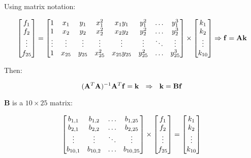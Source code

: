 \documentclass{ipol}
\numberwithin{equation}{section}
\numberwithin{table}{section}
\numberwithin{figure}{section}
\begin{document}
Using matrix notation:

\begin{equation*}
	\begin{bmatrix} 
		f_1		\\ 
		f_2		\\ 
		\vdots	\\
		f_{25}
	\end{bmatrix} 
	= 
	\begin{bmatrix} 
		1 		& x_1 		& y_1 		& x_1^2 	& x_1y_1 		& y_1^2 	& \hdots 	& y_1^3 	\\
		1 		& x_2 		& y_2 		& x_2^2 	& x_2y_2 		& y_2^2 	& \hdots 	& y_2^3 	\\
		\vdots	& \vdots	& \vdots	& \vdots	& \vdots		& \vdots	& \ddots	& \vdots	\\
		1 		& x_{25}	& y_{25}	& x_{25}^2 	& x_{25}y_{25} 	& y_{25}^2 	& \hdots 	& y_{25}^3
	\end{bmatrix}
	\times
	\begin{bmatrix}
		k_1		\\
		k_2		\\
		\vdots	\\
		k_{10}
	\end{bmatrix}
	\Rightarrow \mathbf{f} = \mathbf{A}\mathbf{k}\\
\end{equation*}

Then:

\begin{equation*}
	(\mathbf{A}^T\mathbf{A})^{-1}\mathbf{A}^T\mathbf{f} = \mathbf{k} \ \ \Rightarrow \ \ \mathbf{k} = \mathbf{B}\mathbf{f}\\
\end{equation*}

$\mathbf{B}$ is a $10\times25$ matrix: 

\begin{equation*}
	\begin{bmatrix}
		b_{1,1}		& b_{1,2}	& \hdots	& b_{1,25}	\\
		b_{2,1}		& b_{2,2}	& \hdots	& b_{2,25}	\\
		\vdots		& \vdots	& \ddots	& \vdots	\\
		b_{10,1}	& b_{10,2}	& \hdots	& b_{10,25}
	\end{bmatrix}
	\times
	\begin{bmatrix}
		f_1		\\
		f_2		\\
		\vdots	\\
		f_{25}
	\end{bmatrix}
	=
	\begin{bmatrix}
		k_1		\\
		k_2		\\
		\vdots	\\
		k_{10}
	\end{bmatrix}\\
\end{equation*}
\end{document}
